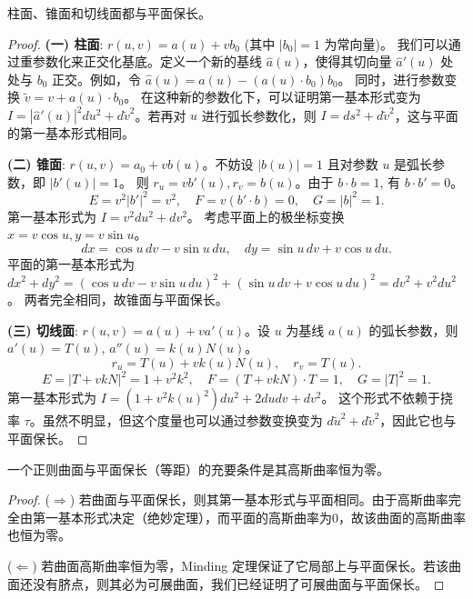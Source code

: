 \documentclass[lang=cn,10pt,thmcnt=section]{elegantbook}
\begin{document}
\begin{proposition}
    柱面、锥面和切线面都与平面保长。
\end{proposition}
\begin{proof}
    \textbf{(一) 柱面}: $r(u,v) = a(u) + v b_0$ (其中 $|b_0|=1$ 为常向量)。
    我们可以通过重参数化来正交化基底。定义一个新的基线 $\hat{a}(u)$，使得其切向量 $\hat{a}'(u)$ 处处与 $b_0$ 正交。例如，令 $\hat{a}(u) = a(u) - (a(u) \cdot b_0) b_0$。
    同时，进行参数变换 $\tilde{v} = v + a(u) \cdot b_0$。
    在这种新的参数化下，可以证明第一基本形式变为 $I = |\hat{a}'(u)|^2 du^2 + d\tilde{v}^2$。若再对 $u$ 进行弧长参数化，则 $I = ds^2 + d\tilde{v}^2$，这与平面的第一基本形式相同。

    \textbf{(二) 锥面}: $r(u,v) = a_0 + v b(u)$。不妨设 $|b(u)|=1$ 且对参数 $u$ 是弧长参数，即 $|b'(u)|=1$。
    则 $r_u = v b'(u), r_v = b(u)$。由于 $b\cdot b=1$, 有 $b \cdot b' = 0$。
    \[ E = v^2|b'|^2 = v^2, \quad F = v(b'\cdot b) = 0, \quad G = |b|^2 = 1. \]
    第一基本形式为 $I = v^2 du^2 + dv^2$。
    考虑平面上的极坐标变换 $x = v \cos u, y = v \sin u$。
    \[ dx = \cos u \,dv - v \sin u \,du, \quad dy = \sin u \,dv + v \cos u \,du. \]
    平面的第一基本形式为 $dx^2 + dy^2 = (\cos u \,dv - v \sin u \,du)^2 + (\sin u \,dv + v \cos u \,du)^2 = dv^2 + v^2 du^2$。
    两者完全相同，故锥面与平面保长。

    \textbf{(三) 切线面}: $r(u,v) = a(u) + v a'(u)$。设 $u$ 为基线 $a(u)$ 的弧长参数，则 $a'(u)=T(u)$, $a''(u)=k(u)N(u)$。
    \[ r_u = T(u) + v k(u) N(u), \quad r_v = T(u). \]
    \[ E = |T+vkN|^2 = 1+v^2k^2, \quad F = (T+vkN)\cdot T = 1, \quad G = |T|^2 = 1. \]
    第一基本形式为 $I = (1+v^2k(u)^2)du^2 + 2du dv + dv^2$。
    这个形式不依赖于挠率 $\tau$。虽然不明显，但这个度量也可以通过参数变换变为 $d\tilde{u}^2 + d\tilde{v}^2$，因此它也与平面保长。
\end{proof}

\begin{theorem}
    一个正则曲面与平面保长（等距）的充要条件是其高斯曲率恒为零。
\end{theorem}
\begin{proof}
    ($\Rightarrow$) 若曲面与平面保长，则其第一基本形式与平面相同。由于高斯曲率完全由第一基本形式决定（绝妙定理），而平面的高斯曲率为0，故该曲面的高斯曲率也恒为零。
    
    ($\Leftarrow$) 若曲面高斯曲率恒为零，Minding 定理保证了它局部上与平面保长。若该曲面还没有脐点，则其必为可展曲面，我们已经证明了可展曲面与平面保长。
\end{proof}
\end{document}
